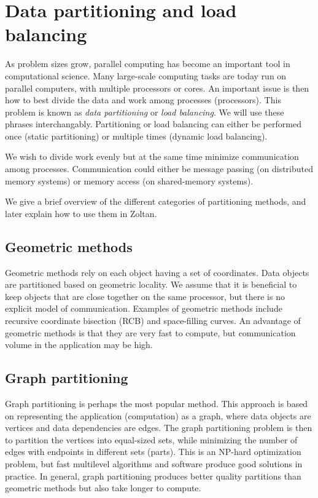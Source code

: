 %
%
\chapter{Data partitioning and load balancing}
\label{cha:lb}
As problem sizes grow, parallel computing has become an important tool
in computational science. Many large-scale computing tasks are
today run on parallel computers, with multiple processors or cores.
An important issue is then how to best divide the data and work
among processes (processors). This problem is known as \emph{data partitioning}
or \emph{load balancing}. We will use these phrases interchangably.
Partitioning or load balancing can either be performed once
(static partitioning) or multiple times (dynamic load balancing).

We wish to divide work evenly but at the same time minimize
communication among processes. Communication could either be
message passing (on distributed memory systems) or memory access
(on shared-memory systems). 

We give a brief overview of the different categories of partitioning methods,
and later explain how to use them in Zoltan.


\section{Geometric methods}
Geometric methods rely on each object having a set of coordinates.
Data objects are partitioned based on geometric locality.
We assume that it is beneficial to keep objects that are close together on 
the same processor, but there is no explicit model of communication.
Examples of geometric methods include recursive coordinate bisection (RCB)
and space-filling curves. An advantage of geometric methods is that
they are very fast to compute, but communication volume in
the application may be high.

\section{Graph partitioning}
Graph partitioning is perhaps the most popular method. This approach is
based on representing the application 
(computation) as a graph, where data objects are vertices and 
data dependencies are edges. The graph partitioning problem is then
to partition the vertices into equal-sized sets, while minimizing the
number of edges with endpoints in different sets (parts).
This is an NP-hard optimization problem, but fast multilevel 
algorithms and software produce good solutions in practice.
In general, graph partitioning produces better quality partitions
than geometric methods but also take longer to compute.


